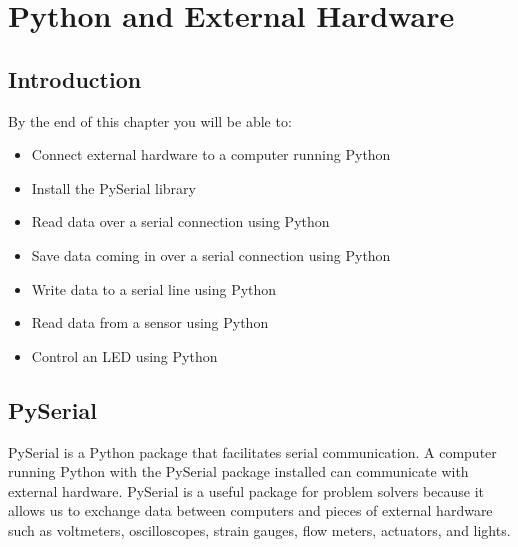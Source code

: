 \documentclass{book}
\begin{document}
    




    
        \hypertarget{python-and-external-hardware}{%
\chapter{Python and External
Hardware}\label{python-and-external-hardware}}
    




    
        \hypertarget{introduction}{%
\section{Introduction}\label{introduction}}
    




    
        By the end of this chapter you will be able to:

\begin{itemize}
\item
  Connect external hardware to a computer running Python
\item
  Install the PySerial library
\item
  Read data over a serial connection using Python
\item
  Save data coming in over a serial connection using Python
\item
  Write data to a serial line using Python
\item
  Read data from a sensor using Python
\item
  Control an LED using Python
\end{itemize}
        \newpage

    




    
        \hypertarget{pyserial}{%
\section{PySerial}\label{pyserial}}
    




    
        PySerial is a Python package that facilitates serial communication. A
computer running Python with the PySerial package installed can
communicate with external hardware. PySerial is a useful package for
problem solvers because it allows us to exchange data between computers
and pieces of external hardware such as voltmeters, oscilloscopes,
strain gauges, flow meters, actuators, and lights.
\end{document}
